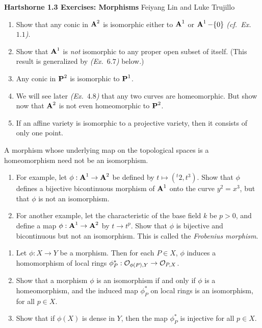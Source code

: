 \documentclass[10pt]{amsart}
\newcommand{\header}[2]{
    {\noindent
    {\Large \bf Hartshorne #1 Exercises: #2}
    \hfill 
    {\large Feiyang Lin and Luke Trujillo}
    \vspace{0.5cm}}
}
\begin{document}
\header{1.3}{Morphisms}

\begin{exercise}[3.1]
    \begin{enumerate}[itemsep=1pt]
    \item Show that any conic in $\aa^2$ is isomorphic either to $\aa^1$ or
        $\aa^1 - \{0\}$ \emph{(cf.\ Ex.~$1.1$)}.
    \item Show that $\aa^1$ is \emph{not} isomorphic to any proper open subset
        of itself. (This result is generalized by \emph{(Ex.~$6.7$)} below.)
    \item Any conic in $\pp^2$ is isomorphic to $\pp^1$.
    \item We will see later \emph{(Ex.\ $4.8$)} that any two curves are
        homeomorphic. But show now that $\aa^2$ is not even homeomorphic to
        $\pp^2$.
    \item If an affine variety is isomorphic to a projective variety, then it
        consists of only one point.
    \end{enumerate}
\end{exercise}


\begin{exercise}[3.2]
    A morphism whose underlying map on the topological spaces 
    is a homeomorphism need not be an isomorphism.
    \begin{enumerate}[itemsep=1pt]
        \item For example, let $\phi : \aa^1  \to \aa^2$ be defined by 
        $t \mapsto (^t2,t^3)$. Show that $\phi$ defines a
        bijective bicontinuous morphism of $\aa^1$ onto the curve $y^2 = x^3$, 
        but that $\phi$ is not an isomorphism.

        \item For another example, let the characteristic of the base field $k$ be $p > 0$, and
        define a map $\phi : \aa^1 \to \aa^2$ by $t \to t^p$. Show that $\phi$ 
        is bijective and bicontinuous but not an isomorphism. 
        This is called the \emph{Frobenius morphism}.
    \end{enumerate}
\end{exercise}


\begin{exercise}[3.3]
    \begin{enumerate}[itemsep=1pt]
        \item 
        Let $\phi:X \to Y$ be a morphism. Then for each $P \in X$, $\phi$ 
        induces a homomorphism of local rings 
        $\phi_P^*: \cO_{\phi(P), Y} \to \cO_{P, X}$.

        \item Show that a morphism $\phi$ is an isomorphism if and only if $\phi$ is a 
        homeomorphism, and the induced map $\phi_P^*$ on local rings 
        is an isomorphism, for all $p \in X$. 

        \item Show that if $\phi(X)$ is dense in $Y$, 
        then the map $\phi_P^*$ is injective for all $p \in X$.
    \end{enumerate}
    
\end{exercise}
\end{document}
